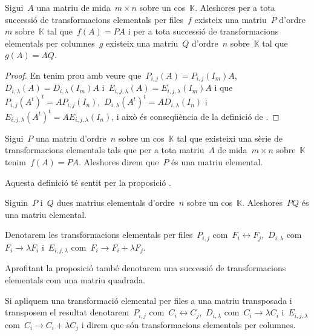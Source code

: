 \documentclass[../../main.tex]{subfiles}
\begin{document}
	\begin{proposition}
		\label{prop:transformacions elementals i matrius elementals}
		Sigui~\(A\) una matriu de mida~\(m\times n\) sobre un cos~\(\mathbb{K}\).
		Aleshores per a tota successió de transformacions elementals per files~\(f\) existeix una matriu~\(P\) d'ordre~\(m\) sobre~\(\mathbb{K}\) tal que~\(f(A)=PA\) i per a tota successió de transformacions elementals per columnes~\(g\) existeix una matriu~\(Q\) d'ordre~\(n\) sobre~\(\mathbb{K}\) tal que~\(g(A)=AQ\).
%
		\begin{proof}
			En tenim prou amb veure que~\(P_{i,j}(A)=P_{i,j}(I_{m})A\),~\(D_{i,\lambda}(A)=D_{i,\lambda}(I_{m})A\) i~\(E_{i,j,\lambda}(A)=E_{i,j,\lambda}(I_{m})A\) i que~\(P_{i,j}(A^{t})^{t}=AP_{i,j}(I_{n})\),~\(D_{i,\lambda}(A^{t})^{t}=AD_{i,\lambda}(I_{n})\) i~\(E_{i,j,\lambda}(A^{t})^{t}=AE_{i,j,\lambda}(I_{n})\), i això és conseqüència de la definició de .
		\end{proof}
	\end{proposition}
	\begin{definition}
		\label{def:matriu elemental}
		Sigui~\(P\) una matriu d'ordre~\(n\) sobre un cos~\(\mathbb{K}\) tal que existeixi una sèrie de transformacions elementals tals que per a tota matriu~\(A\) de mida~\(m\times n\) sobre~\(\mathbb{K}\) tenim~\(f(A)=PA\).
		Aleshores direm que~\(P\) és una matriu elemental.

		Aquesta definició té sentit per la proposició .
	\end{definition}
	\begin{observation}
		\label{obs:producte de matrius elementals és matriu elemental}
		Siguin~\(P\) i~\(Q\) dues matrius elementals d'ordre~\(n\) sobre un cos~\(\mathbb{K}\).
		Aleshores~\(PQ\) és una matriu elemental.
	\end{observation}
	\begin{notation}
		Denotarem les transformacions elementals per files~\(P_{i,j}\) com~\(F_{i}\leftrightarrow F_{j}\),~\(D_{i,\lambda}\) com~\(F_{i}\rightarrow\lambda F_{i}\) i~\(E_{i,j,\lambda}\) com~\(F_{i}\rightarrow F_{i}+\lambda F_{j}\).

		Aprofitant la proposició  també denotarem una successió de transformacions elementals com una matriu quadrada.

		Si apliquem una transformació elemental per files a una matriu transposada i transposem el resultat denotarem~\(P_{i,j}\) com~\(C_{i}\leftrightarrow C_{j}\),~\(D_{i,\lambda}\) com~\(C_{i}\rightarrow\lambda C_{i}\) i~\(E_{i,j,\lambda}\) com~\(C_{i}\rightarrow C_{i}+\lambda C_{j}\) i direm que són transformacions elementals per columnes.
	\end{notation}
\end{document}
